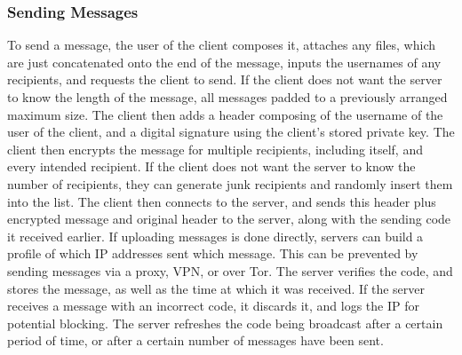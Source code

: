 \documentclass{article}
\begin{document}
\subsubsection{Sending Messages}
To send a message, the user of the client composes it, attaches any files, which are just concatenated onto the end of the message, inputs the usernames of any recipients, and requests the client to send. If the client does not want the server to know the length of the message, all messages padded to a previously arranged maximum size. The client then adds a header composing of the username of the user of the client, and a digital signature using the client's stored private key. The client then encrypts the message for multiple recipients, including itself, and every intended recipient. If the client does not want the server to know the number of recipients, they can generate junk recipients and randomly insert them into the list. The client then connects to the server, and sends this header plus encrypted message and original header to the server, along with the sending code it received earlier. If uploading messages is done directly, servers can build a profile of which IP addresses sent which message. This can be prevented by sending messages via a proxy, VPN, or over Tor. The server verifies the code, and stores the message, as well as the time at which it was received. If the server receives a message with an incorrect code, it discards it, and logs the IP for potential blocking. The server refreshes the code being broadcast after a certain period of time, or after a certain number of messages have been sent.
\end{document}
